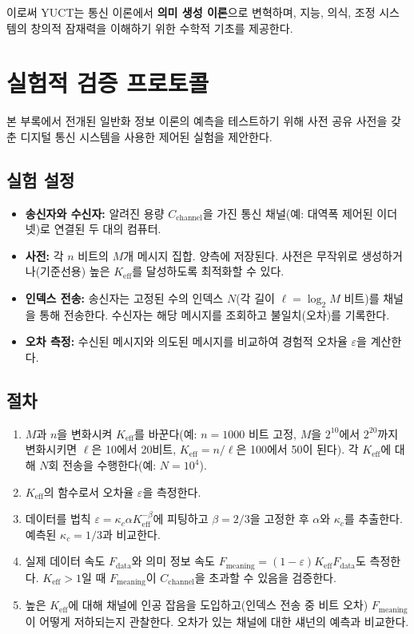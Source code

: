 \documentclass[12pt,a4paper]{article}
\newcommand{\Keff}{K_{\mathrm{eff}}}
\begin{document}
	이로써 YUCT는 통신 이론에서 \textbf{의미 생성 이론}으로 변혁하며, 지능, 의식, 조정 시스템의 창의적 잠재력을 이해하기 위한 수학적 기초를 제공한다.
	
	\section{실험적 검증 프로토콜}
	\label{sec:experiment}
	
	본 부록에서 전개된 일반화 정보 이론의 예측을 테스트하기 위해 사전 공유 사전을 갖춘 디지털 통신 시스템을 사용한 제어된 실험을 제안한다.
	
	\subsection{실험 설정}
	
	\begin{itemize}
		\item \textbf{송신자와 수신자:} 알려진 용량 $C_{\text{channel}}$을 가진 통신 채널(예: 대역폭 제어된 이더넷)로 연결된 두 대의 컴퓨터.
		\item \textbf{사전:} 각 $n$ 비트의 $M$개 메시지 집합. 양측에 저장된다. 사전은 무작위로 생성하거나(기준선용) 높은 $\Keff$를 달성하도록 최적화할 수 있다.
		\item \textbf{인덱스 전송:} 송신자는 고정된 수의 인덱스 $N$(각 길이 $\ell = \log_2 M$ 비트)를 채널을 통해 전송한다. 수신자는 해당 메시지를 조회하고 불일치(오차)를 기록한다.
		\item \textbf{오차 측정:} 수신된 메시지와 의도된 메시지를 비교하여 경험적 오차율 $\varepsilon$을 계산한다.
	\end{itemize}
	
	\subsection{절차}
	
	\begin{enumerate}
		\item $M$과 $n$을 변화시켜 $\Keff$를 바꾼다(예: $n=1000$ 비트 고정, $M$을 $2^{10}$에서 $2^{20}$까지 변화시키면 $\ell$은 10에서 20비트, $\Keff = n/\ell$은 100에서 50이 된다). 각 $\Keff$에 대해 $N$회 전송을 수행한다(예: $N=10^4$).
		\item $\Keff$의 함수로서 오차율 $\varepsilon$을 측정한다.
		\item 데이터를 법칙 $\varepsilon = \kappa_c \alpha K_{\mathrm{eff}}^{-\beta}$에 피팅하고 $\beta=2/3$을 고정한 후 $\alpha$와 $\kappa_c$를 추출한다. 예측된 $\kappa_c=1/3$과 비교한다.
		\item 실제 데이터 속도 $F_{\text{data}}$와 의미 정보 속도 $F_{\text{meaning}} = (1-\varepsilon) \Keff F_{\text{data}}$도 측정한다. $\Keff>1$일 때 $F_{\text{meaning}}$이 $C_{\text{channel}}$을 초과할 수 있음을 검증한다.
		\item 높은 $\Keff$에 대해 채널에 인공 잡음을 도입하고(인덱스 전송 중 비트 오차) $F_{\text{meaning}}$이 어떻게 저하되는지 관찰한다. 오차가 있는 채널에 대한 섀넌의 예측과 비교한다.
	\end{enumerate}
	
\end{document}
